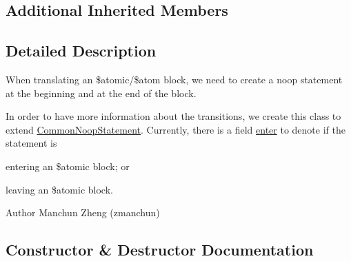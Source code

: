 \subsection*{Additional Inherited Members}


\subsection{Detailed Description}
When translating an \$atomic/\$atom block, we need to create a noop statement at the beginning and at the end of the block. 

In order to have more information about the transitions, we create this class to extend \hyperlink{classedu_1_1udel_1_1cis_1_1vsl_1_1civl_1_1model_1_1common_1_1statement_1_1CommonNoopStatement}{Common\+Noop\+Statement}. Currently, there is a field \hyperlink{}{enter} to denote if the statement is 
\begin{DoxyEnumerate}
\item entering an \$atomic block; or 
\item leaving an \$atomic block. 
\end{DoxyEnumerate}

\begin{DoxyAuthor}{Author}
Manchun Zheng (zmanchun) 
\end{DoxyAuthor}


\subsection{Constructor \& Destructor Documentation}
\hypertarget{classedu_1_1udel_1_1cis_1_1vsl_1_1civl_1_1model_1_1common_1_1statement_1_1CommonAtomicLockAssignStatement_a84ce2e3e55a4a7f3173931b7172d3909}{}
